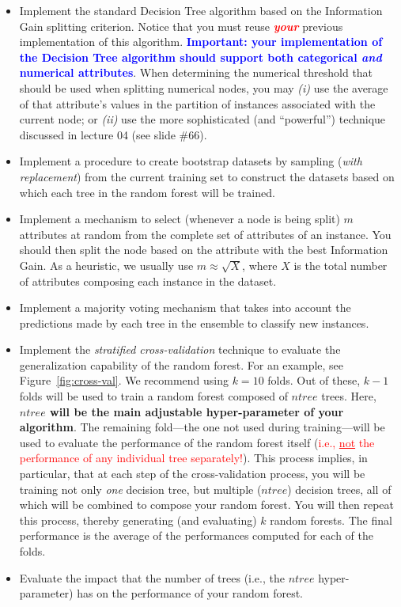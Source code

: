\documentclass[letterpaper]{article}
\newcommand{\HIGHLIGHT}[1]{\textcolor{blue}{\textbf{#1}}}
\begin{document}
\begin{itemize}
\item Implement the standard Decision Tree algorithm based on the Information Gain splitting criterion. Notice that you must reuse \textbf{\textcolor{red}{\textit{your}}} previous implementation of this algorithm. \HIGHLIGHT{Important: your implementation of the Decision Tree algorithm should support both categorical \textit{and} numerical attributes}. When determining the numerical threshold that should be used when splitting numerical nodes, you may \textit{(i)} use the average of that attribute's values in the partition of instances associated with the current node; or \textit{(ii)} use the more sophisticated (and ``powerful'') technique discussed in lecture 04 (see slide \#66). 
\item Implement a procedure to create bootstrap datasets by sampling (\textit{with replacement}) from the current training set to construct the datasets based on which each tree in the random forest will be trained. 
\item Implement a mechanism to select (whenever a node is being split) $m$ attributes at random from the complete set of attributes of an instance. You should then split the node based on the attribute with the best Information Gain. As a heuristic, we usually use $m \approx \sqrt{X}$, where $X$ is the total number of attributes composing each instance in the dataset.
\item Implement a majority voting mechanism that takes into account the predictions made by each tree in the ensemble to classify new instances.
\item Implement the \textit{stratified cross-validation} technique to evaluate the generalization capability of the random forest. For an example, see Figure~\ref{fig:cross-val}. We recommend using $k=10$ folds. Out of these, $k-1$ folds will be used to train a random forest composed of $ntree$ trees. Here, \textbf{$ntree$ will be the main adjustable hyper-parameter of your algorithm}. The remaining fold---the one not used during training---will be used to evaluate the performance of the random forest itself (\textcolor{red}{i.e., \underline{not} the performance of any individual tree separately!}). This process implies, in particular, that at each step of the cross-validation process, you will be training not only \textit{one} decision tree, but multiple ($ntree$) decision trees, all of which will be combined to compose your random forest. You will then repeat this process, thereby generating (and evaluating) $k$ random forests. The final performance is the average of the performances computed for each of the folds.
\item Evaluate the impact that the number of trees (i.e., the $ntree$ hyper-parameter) has on the performance of your random forest.


\end{itemize}
\end{document}
